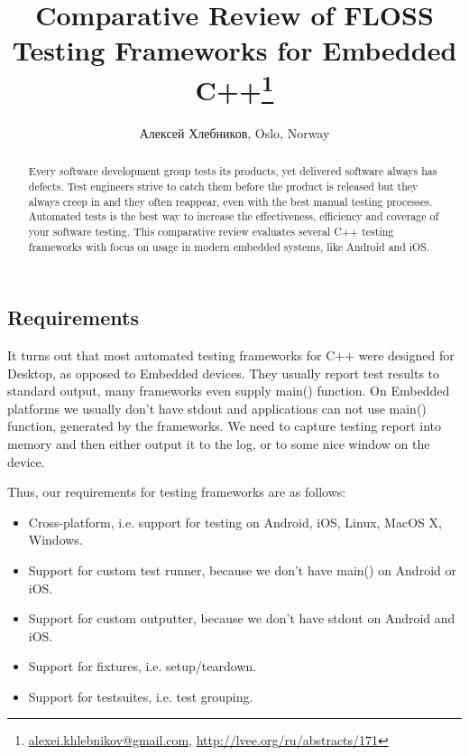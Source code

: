 \documentclass[10pt, a5paper]{article}
\begin{document}
\title{Comparative Review of FLOSS Testing Frameworks for Embedded C++\footnote{\url{alexei.khlebnikov@gmail.com}, \url{http://lvee.org/ru/abstracts/171}}}
\author{Алексей Хлебников, Oslo, Norway}
\maketitle
\begin{abstract}
Every software development group tests its products, yet delive\-red software always has defects. Test engineers strive to catch them before the product is released but they always creep in and they often reappear, even with the best manual testing processes. Automated tests is the best way to increase \linebreak the effectiveness, efficiency and coverage of your software testing. This comparative review evaluates several C++ testing \linebreak frameworks with focus on usage in modern embedded systems, like Android and iOS.
\end{abstract}
\subsection*{Requirements}

It turns out that most automated testing frameworks for C++ were designed for Desktop, as opposed to Embedded devices. They usually report test results to standard output, many frameworks even supply main() function. On Embedded platforms we usually don't have stdout and applications can not use main() function, generated by the frameworks. We need to capture testing report into memory and then either output it to the log, or to some nice window on the device.

Thus, our requirements for testing frameworks are as follows:

\begin{itemize}
  \item Cross-platform, i.e. support for testing on Android, iOS, Linux, MacOS X, Windows.
  \item Support for custom test runner, because we don't have main() on Android or iOS.
  \item Support for custom outputter, because we don't have stdout on Android and iOS.
  \item Support for fixtures, i.e. setup/teardown.
  \item Support for testsuites, i.e. test grouping.
\end{itemize}
\end{document}
